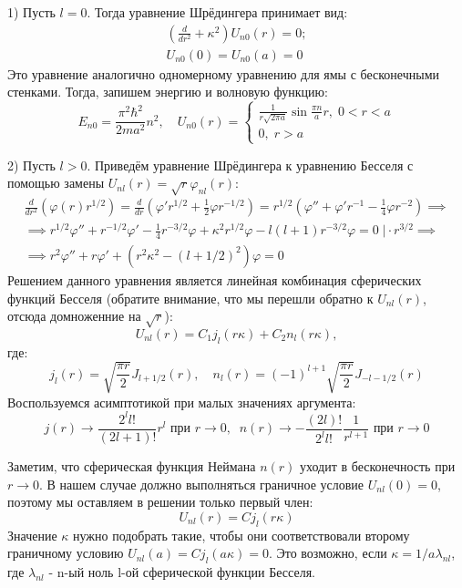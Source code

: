 1) Пусть $l = 0$. Тогда уравнение Шрёдингера принимает вид: 
\begin{gather*}
\left(\frac{d}{dr^2} + \kappa^2\right)U_{n0}(r) = 0;\\
U_{n0}(0) = U_{n0}(a) = 0
\end{gather*}
Это уравнение аналогично одномерному уравнению для ямы с бесконечными стенками. Тогда, запишем энергию и волновую функцию:
\[
E_{n0} = \frac{\pi^2\hbar^2}{2ma^2}n^2, \quad U_{n0}(r) =
\begin{cases}
    \frac{1}{r\sqrt{2\pi a}}\sin\frac{\pi n}{a}r, \; 0 < r < a\\
    0, \; r > a
\end{cases}
\]

2) Пусть $l > 0$. Приведём уравнение Шрёдингера к уравнению Бесселя с помощью замены $U_{nl}(r) = \sqrt{r}\varphi_{nl}(r)$:
\begin{gather*}
\frac{d}{dr^2}\left(\varphi(r)r^{1/2}\right) = \frac{d}{dr}\left( \varphi'r^{1/2} + \frac{1}{2}\varphi r^{-1/2} \right) = r^{1/2}\left(\varphi'' + \varphi'r^{-1} - \frac{1}{4}\varphi r^{-2}\right) \implies \\
\implies r^{1/2}\varphi'' + r^{-1/2}\varphi' - \frac{1}{4}r^{-3/2}\varphi + \kappa^2r^{1/2}\varphi - l(l+1)r^{-3/2}\varphi = 0 \; \Bigg| \cdot r^{3/2} \implies \\
\implies r^2\varphi''+ r\varphi' + (r^2\kappa^2 - (l+1/2)^2)\varphi = 0
\end{gather*}
Решением данного уравнения является линейная комбинация сферических функций Бесселя (обратите внимание, что мы перешли обратно к $U_{nl}(r)$, отсюда домноженние на $\sqrt{r}$):
\[
U_{nl}(r) = C_1j_l(r\kappa) + C_2n_l(r\kappa),
\]
где:
\[
j_l(r) = \sqrt{\frac{\pi r}{2}}J_{l+1/2}(r), \quad n_l(r) = (-1)^{l+1}\sqrt{\frac{\pi r}{2}}J_{-l-1/2}(r)
\]
Воспользуемся асимптотикой при малых значениях аргумента:
\[
j(r)\rightarrow\frac{2^l l!}{(2l+1)!}r^l \text{ при } r\rightarrow0, \;\; n(r)\rightarrow -\frac{(2l)!}{2^l l!}\frac{1}{r^{l+1}} \text{ при } r\rightarrow 0 
\]

Заметим, что сферическая функция Неймана $n(r)$ уходит в бесконечность при $r \rightarrow 0$. В нашем случае должно выполняться граничное условие $U_{nl}(0) = 0$, поэтому мы оставляем в решении только первый член:
\[
U_{nl}(r) = Cj_l(r\kappa)
\]
Значение $\kappa$ нужно подобрать такие, чтобы они соответствовали второму граничному условию $U_{nl}(a) = Cj_l(a\kappa) = 0$. Это возможно, если $\kappa = 1/a \lambda_{nl}$, где $\lambda_{nl}$ - n-ый ноль l-ой сферической функции Бесселя. 

